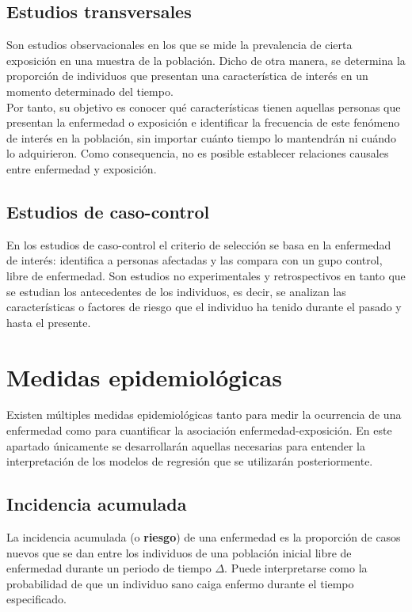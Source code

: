 \subsection{Estudios transversales}
Son estudios observacionales en los que se mide la prevalencia de cierta exposición en una muestra de la población. Dicho de otra manera, se determina la proporción de individuos que presentan una característica de interés en un momento determinado del tiempo. \\

Por tanto, su objetivo es conocer qué características tienen aquellas personas que presentan la enfermedad o exposición e identificar la frecuencia de este fenómeno de interés en la población, sin importar cuánto tiempo lo mantendrán ni cuándo lo adquirieron. Como consequencia, no es posible establecer relaciones causales entre enfermedad y exposición. \\

\subsection{Estudios de caso-control}
En los estudios de caso-control el criterio de selección se basa en la enfermedad de interés: identifica a personas afectadas y las compara con un gupo control, libre de enfermedad. Son estudios no experimentales y retrospectivos en tanto que se estudian los antecedentes de los individuos, es decir, se analizan las características o factores de riesgo que el individuo ha tenido durante el pasado y hasta el presente. \\

\section{Medidas epidemiológicas}\label{sec:medidas}

Existen múltiples medidas epidemiológicas tanto para medir la ocurrencia de una enfermedad como para cuantificar la asociación enfermedad-exposición. En este apartado únicamente se desarrollarán aquellas necesarias para entender la interpretación de los modelos de regresión que se utilizarán posteriormente.

\subsection{Incidencia acumulada}
La incidencia acumulada (o \textbf{riesgo}) de una enfermedad es la proporción de casos nuevos que se dan entre los individuos de una población inicial libre de enfermedad durante un periodo de tiempo $\Delta$. Puede interpretarse como la probabilidad de que un individuo sano caiga enfermo durante el tiempo especificado.\\

